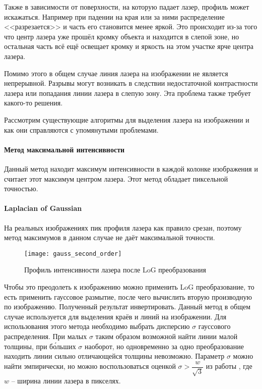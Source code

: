             Также в зависимости от поверхности, на которую падает лазер, профиль может искажаться. Например при падении на края или за ними распределение <<разрезается>> и часть его становится менее яркой. Это происходит из-за того что центр лазера уже прошёл кромку объекта и находится в слепой зоне, но остальная часть всё ещё освещает кромку и яркость на этом участке ярче центра лазера\cite{DavidenkoREFERAT}. 
            
            Помимо этого в общем случае линия лазера на изображении не является непрерывной. Разрывы могут возникать в следствии недостаточной контрастности лазера или попадания линии лазера в слепую зону. Эта проблема также требует какого-то решения.
            
            Рассмотрим существующие алгоритмы для выделения лазера на изображении и как они справляются с упомянутыми проблемами.
            
            \paragraph{Метод максимальной интенсивности}
                Данный метод находит максимум интенсивности в каждой колонке изображения и считает этот максимум центром лазера. Этот метод обладает пиксельной точностью.
            
            \paragraph{Laplacian of Gaussian}
                На реальных изображениях пик профиля лазера как правило срезан, поэтому метод максимумов в данном случае не даёт максимальной точности\cite{Molder2014}. 
                 
                \begin{wrapfigure}{r}{0.4\linewidth}
                    \centering
                    \texttt{[image: gauss\_second\_order]}
                    \caption{Профиль интенсивности лазера после LoG преобразования}
                \end{wrapfigure}
                Чтобы это преодолеть к изображению можно применить LoG преобразование, то есть применить гауссовое размытие, после чего вычислить вторую производную по изображению. Полученный результат инвертировать. Данный метод в общем случае используется для выделения краёв и линий на изображении\cite{Steger2000}. Для использования этого метода необходимо выбрать дисперсию $ \sigma $ гауссового распределения. При малых $ \sigma $ таким образом возможной найти линии малой толщины, при б\'{о}льших $ \sigma $ наоборот, но одновременно за одно преобразование находить линии сильно отличающейся толщины невозможно.
                Параметр $ \sigma $ можно найти эмпирически, но можно воспользоваться оценкой $ \sigma > \dfrac{w}{\sqrt{3}} $ из работы \cite{Steger2000}, где $ w $ -- ширина линии лазера в пикселях.
                
